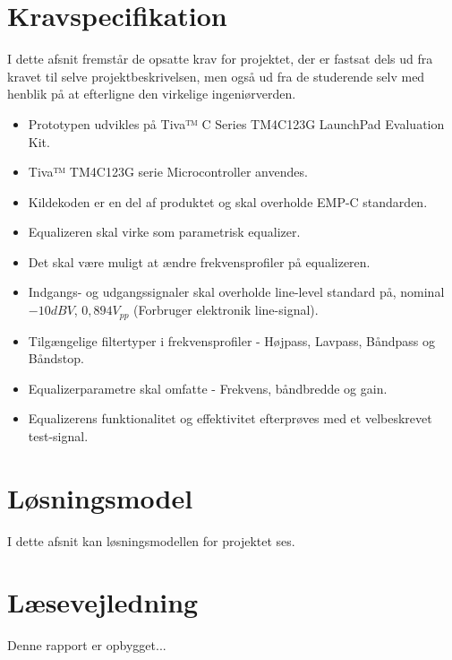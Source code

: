 
\section{Kravspecifikation} \label{afs:kravspecifikation}
I dette afsnit fremstår de opsatte krav for projektet, der er fastsat dels ud fra kravet til selve projektbeskrivelsen, men også ud fra de studerende selv med henblik på at efterligne den virkelige ingeniørverden.

\begin{itemize}
	\item Prototypen udvikles på Tiva™ C Series TM4C123G LaunchPad Evaluation Kit.
	\item Tiva™ TM4C123G serie Microcontroller anvendes.
	\item Kildekoden er en del af produktet og skal overholde EMP-C standarden.
	\item Equalizeren skal virke som parametrisk equalizer.
	\item Det skal være muligt at ændre frekvensprofiler på equalizeren.
	\item Indgangs- og udgangssignaler skal overholde line-level standard på, nominal $-10 dBV$, $0,894 V_{pp}$ (Forbruger elektronik line-signal).
	\item Tilgængelige filtertyper i frekvensprofiler - Højpass, Lavpass, Båndpass og Båndstop.
	\item Equalizerparametre skal omfatte - Frekvens, båndbredde og gain.
	\item Equalizerens funktionalitet og effektivitet efterprøves med et velbeskrevet test-signal.
\end{itemize}

\section{Løsningsmodel}
I dette afsnit kan løsningsmodellen for projektet ses.

\section{Læsevejledning}
Denne rapport er opbygget...
